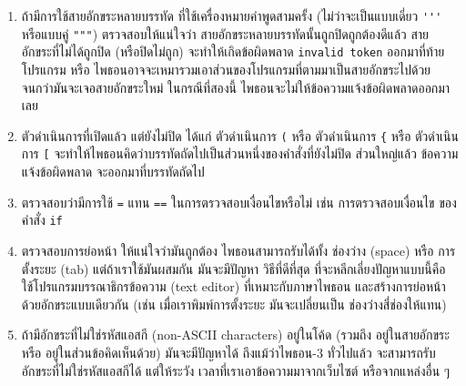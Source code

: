 \begin{enumerate}
\item ถ้ามีการใช้สายอักขระหลายบรรทัด ที่ใช้เครื่องหมายคำพูดสามครั้ง (ไม่ว่าจะเป็นแบบเดี่ยว \verb|'''| หรือแบบคู่ \verb|"""|)
ตรวจสอบให้แน่ใจว่า สายอักขระหลายบรรทัดนั้นถูกปิดถูกต้องดีแล้ว
สายอักขระที่ไม่ได้ถูกปิด (หรือปิดไม่ถูก) จะทำให้เกิดข้อผิดพลาด \texttt{invalid token} ออกมาที่ท้ายโปรแกรม
หรือ ไพธอนอาจจะเหมารวมเอาส่วนของโปรแกรมที่ตามมาเป็นสายอักขระไปด้วย 
จนกว่ามันจะเจอสายอักขระใหม่
ในกรณีที่สองนี้ ไพธอนจะไม่ให้ข้อความแจ้งข้อผิดพลาดออกมาเลย


\item ตัวดำเนินการที่เปิดแล้ว แต่ยังไม่ปิด ได้แก่ ตัวดำเนินการ \verb|(| หรือ ตัวดำเนินการ \verb|{| หรือ ตัวดำเนินการ \verb|[|
จะทำให้ไพธอนคิดว่าบรรทัดถัดไปเป็นส่วนหนึ่งของคำสั่งที่ยังไม่ปิด
ส่วนใหญ่แล้ว ข้อความแจ้งข้อผิดพลาด จะออกมาที่บรรทัดถัดไป



\item ตรวจสอบว่ามีการใช้ \texttt{=} แทน \texttt{==} ในการตรวจสอบเงื่อนไขหรือไม่ เช่น การตรวจสอบเงื่อนไข ของคำสั่ง \verb|if|


\item ตรวจสอบการย่อหน้า ให้แน่ใจว่ามันถูกต้อง
ไพธอนสามารถรับได้ทั้ง ช่องว่าง (space) หรือ การตั้งระยะ (tab)
แต่ถ้าเราใช้มันผสมกัน มันจะมีปัญหา
วิธีที่ดีที่สุด ที่จะหลีกเลี่ยงปัญหาแบบนี้คือ ใช้โปรแกรมบรรณาธิกรข้อความ (text editor) ที่เหมาะกับภาษาไพธอน และสร้างการย่อหน้าด้วยอักขระแบบเดียวกัน (เช่น เมื่อเราพิมพ์การตั้งระยะ มันจะเปลี่ยนเป็น ช่องว่างสี่ช่องให้แทน)



\item ถ้ามีอักขระที่ไม่ใช่รหัสแอสกี (non-ASCII characters) อยู่ในโค้ด (รวมถึง อยู่ในสายอักขระ หรือ อยู่ในส่วนข้อคิดเห็นด้วย) มันจะมีปัญหาได้
ถึงแม้ว่าไพธอน-3 ทั่วไปแล้ว จะสามารถรับอักขระที่ไม่ใช่รหัสแอสกีได้
แต่ให้ระวัง เวลาที่เราเอาข้อความมาจากเว็บไซต์ หรือจากแหล่งอื่น ๆ


\end{enumerate}

